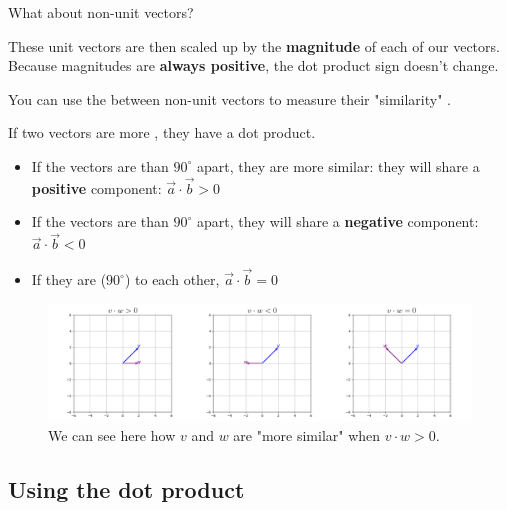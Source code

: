         
        What about non-unit vectors?
        
        These unit vectors are then scaled up by the \textbf{magnitude} of each of our vectors. Because magnitudes are \textbf{always positive}, the dot product sign doesn't change.\\
        
        \begin{concept}
            You can use the  between non-unit vectors to measure their "similarity" . 
            
            If two vectors are more , they have a  dot product. 
            
            \begin{itemize}
                \item If the vectors are  than $90^{\circ}$ apart, they are more similar: they will share a \textbf{positive} component: $\vec{a} \cdot \vec{b} > 0$
                
                \item If the vectors are  than $90^{\circ}$ apart, they will share a \textbf{negative} component: $\vec{a} \cdot \vec{b} < 0$
                
                \item If they are  ($90^{\circ}$) to each other, $\vec{a} \cdot \vec{b} = 0$
            \end{itemize}
        \end{concept}

        \begin{figure}[H]
            \centering
             \includegraphics[width=120mm,scale=0.5]{images/transformers_images/dot_product_demo.png}
             \caption*{We can see here how $v$ and $w$ are "more similar" when $v \cdot w>0$.}
        \end{figure}
        
    \subsection{Using the dot product}
        
